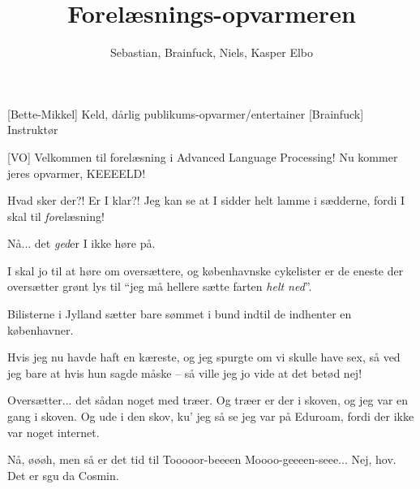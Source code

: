 \documentclass[a4paper,11pt]{article}
\title{Forelæsnings-opvarmeren}
\author{Sebastian, Brainfuck, Niels, Kasper Elbo}
\begin{document}
\maketitle

\begin{roles}
[Bette-Mikkel] Keld, dårlig publikums-opvarmer/entertainer
[Brainfuck] Instruktør
\end{roles}

\begin{props}
\end{props}

\begin{sketch}


[VO] Velkommen til forelæsning i Advanced Language Processing!  Nu kommer jeres opvarmer, KEEEELD!


 Hvad sker der?!  Er I klar?!  Jeg kan se at I sidder helt lamme i sædderne, fordi I skal til \emph{for}elæsning!


 Nå... det \emph{ged}er I ikke høre på.


 I skal jo til at høre om oversættere, og københavnske cykelister er de eneste der oversætter grønt lys til ``jeg må hellere sætte farten \emph{helt ned}''.

 Bilisterne i Jylland sætter bare sømmet i bund indtil de indhenter en københavner.

 Hvis jeg nu havde haft en kæreste, og jeg spurgte om vi skulle have sex, så ved jeg bare at hvis hun sagde måske -- så ville jeg jo vide at det betød nej!

 Oversætter... det sådan noget med træer.  Og træer er der i skoven, og jeg var en gang i skoven.  Og ude i den skov, ku' jeg så se jeg var på Eduroam, fordi der ikke var noget internet.



 Nå, øøøh, men så er det tid til Tooooor-beeeen Moooo-geeeen-seee...
         Nej, hov.  Det er sgu da Cosmin.


\end{sketch}
\end{document}
